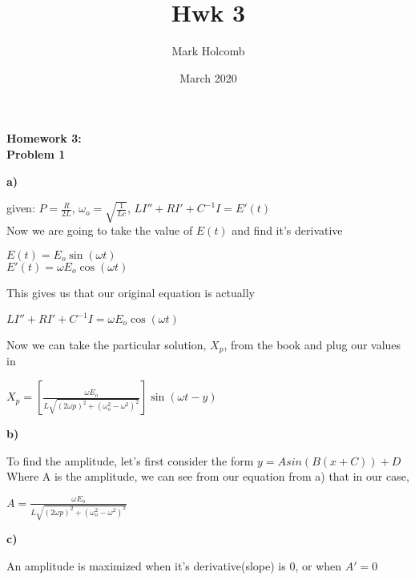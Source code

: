 \documentclass[12pt, letterpaper]{article}
\title{Hwk 3}
\author{Mark Holcomb}
\date{March 2020}
\begin{document}
\LARGE\textbf{Homework 3:}\\

\large\textbf{Problem 1}

\textbf{a)}

given: $P =\frac{R}{2L}$,\indent
       $\omega_o = \sqrt{\frac{1}{Lc}}$,\indent
       $L I'' + RI' + C^{-1}I = E'(t)$ \\

       Now we are going to take the value of $E(t)$ and find it's derivative
       
       \begin{center}
        $E(t) = E_o \sin(\omega t)$\\
        $E'(t) = \omega E_o \cos(\omega t)$
       \end{center}
       
       This gives us that our original equation is actually
       \begin{center}
        $L I'' + RI' + C^{-1}I = \omega E_o \cos(\omega t)$
       \end{center}

       Now we can take the particular solution, $X_p$, from the book and plug our values in
       \begin{center}
        $X_p = [\frac{\omega E_o}{L \sqrt{(2 \omega p)^2 + (\omega_o^2 - \omega^2)^2}}] \sin(\omega t - y)$
       \end{center}

\textbf{b)}

To find the amplitude, let's first consider the form $y = A sin(B(x + C)) + D$\\

Where A is the amplitude, we can see from our equation from a) that in our case,
\begin{center}
    $A = \frac{\omega E_o}{L \sqrt{(2 \omega p)^2 + (\omega_o^2 - \omega^2)^2}}$
\end{center}

\textbf{c)}

An amplitude is maximized when it's derivative(slope) is 0, or when $A' = 0$
\end{document}
